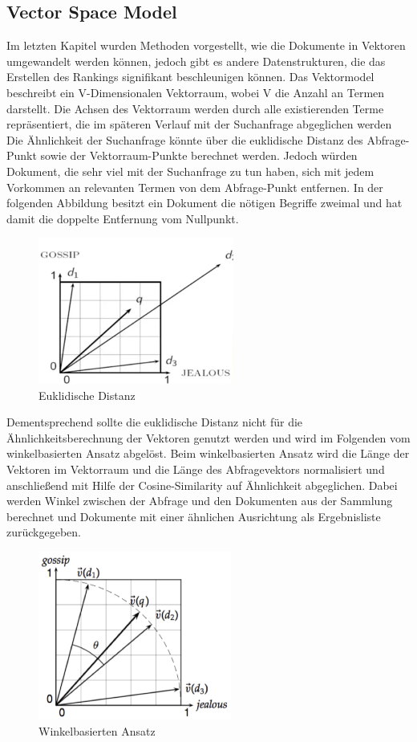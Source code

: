 \subsection[Vector Space Model ]{Vector Space Model }
Im letzten Kapitel wurden Methoden vorgestellt, wie die Dokumente in
Vektoren umgewandelt werden können, jedoch gibt es andere
Datenstrukturen, die das Erstellen des Rankings signifikant
beschleunigen können.
\newline
Das Vektormodel beschreibt ein V-Dimensionalen Vektorraum, wobei V die
Anzahl an Termen darstellt. Die Achsen des Vektorraum werden durch alle
existierenden Terme repräsentiert, die im späteren Verlauf mit der
Suchanfrage abgeglichen werden
\newline
Die Ähnlichkeit der Suchanfrage könnte über die euklidische Distanz des
Abfrage-Punkt sowie der Vektorraum-Punkte berechnet werden. Jedoch
würden Dokument, die sehr viel mit der Suchanfrage zu tun haben, sich
mit jedem Vorkommen an relevanten Termen von dem Abfrage-Punkt
entfernen. In der folgenden Abbildung besitzt ein Dokument die nötigen
Begriffe zweimal und hat damit die doppelte Entfernung vom Nullpunkt.
\begin{figure}[h]
\centering
\includegraphics[width=6.435cm,height=4.81cm]{bilder/SeminararbeitArkadij-img6.png}
\caption {Euklidische Distanz \cite {manning2008introduction}}
\end{figure}
Dementsprechend sollte die euklidische Distanz nicht für die
Ähnlichkeitsberechnung der Vektoren genutzt werden und wird im
Folgenden vom winkelbasierten Ansatz abgelöst. 
\bigbreak
Beim winkelbasierten Ansatz wird die Länge der Vektoren im Vektorraum
und die Länge des Abfragevektors normalisiert und anschließend mit
Hilfe der Cosine-Similarity auf Ähnlichkeit abgeglichen.
\newline
Dabei werden Winkel zwischen der Abfrage und den Dokumenten aus der
Sammlung berechnet und Dokumente mit einer ähnlichen Ausrichtung als
Ergebnisliste zurückgegeben.
\bigbreak
\begin{figure}[H]
\centering
\includegraphics[width=6.361cm,height=5.528cm]{bilder/SeminararbeitArkadij-img7.png}
\caption {Winkelbasierten Ansatz \cite {manning2008introduction}}

\end{figure}
